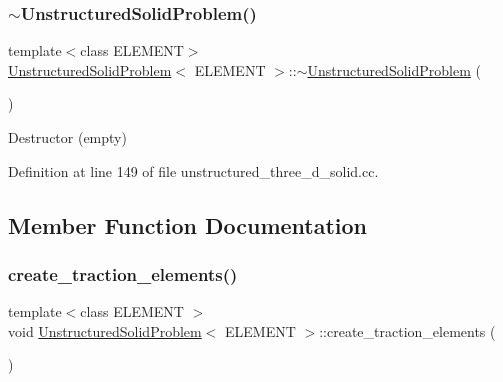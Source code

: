 \mbox{\label{classUnstructuredSolidProblem_a25fe105d949498bf8f7c15aff96a7d00}} 
\subsubsection{\texorpdfstring{$\sim$\+Unstructured\+Solid\+Problem()}{~UnstructuredSolidProblem()}}
{\footnotesize\ttfamily template$<$class E\+L\+E\+M\+E\+NT$>$ \\
\hyperlink{classUnstructuredSolidProblem}{Unstructured\+Solid\+Problem}$<$ E\+L\+E\+M\+E\+NT $>$\+::$\sim$\hyperlink{classUnstructuredSolidProblem}{Unstructured\+Solid\+Problem} (\begin{DoxyParamCaption}{ }\end{DoxyParamCaption})\hspace{0.3cm}{\ttfamily [inline]}}



Destructor (empty) 



Definition at line 149 of file unstructured\+\_\+three\+\_\+d\+\_\+solid.\+cc.



\subsection{Member Function Documentation}
\mbox{\label{classUnstructuredSolidProblem_a9137960284200ed998989f785965f902}} 
\subsubsection{\texorpdfstring{create\+\_\+traction\+\_\+elements()}{create\_traction\_elements()}}
{\footnotesize\ttfamily template$<$class E\+L\+E\+M\+E\+NT $>$ \\
void \hyperlink{classUnstructuredSolidProblem}{Unstructured\+Solid\+Problem}$<$ E\+L\+E\+M\+E\+NT $>$\+::create\+\_\+traction\+\_\+elements (\begin{DoxyParamCaption}{ }\end{DoxyParamCaption})\hspace{0.3cm}{\ttfamily [private]}}



